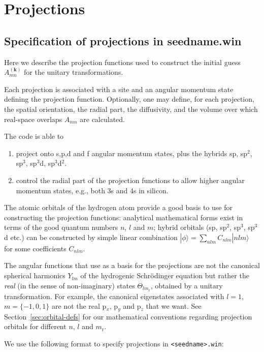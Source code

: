 \chapter{Projections}\label{ch:proj}

\section{Specification of projections in seedname.win}
\label{sec:proj}
Here we describe the projection functions used to construct the
initial guess $A_{mn}^{(\mathbf{k})}$ for the unitary transformations.

Each projection is associated with a site and an angular momentum
state defining the projection function. Optionally, one may define,
for each projection, the spatial orientation, the radial part, the
diffusivity, and the volume over which real-space overlaps $A_{mn}$
are calculated.

The code is able to
\begin{enumerate}
\item project onto s,p,d and f
 angular momentum states, plus the hybrids sp, sp$^2$, sp$^3$, sp$^3$d,
 sp$^3$d$^2$.
\item control the radial part of the projection functions
  to allow higher angular momentum states, e.g., both 3s and 4s in
  silicon.
\end{enumerate}

The atomic orbitals of the hydrogen atom provide a good
basis to use for constructing the projection functions: analytical
mathematical forms exist in terms of the good quantum numbers $n$, $l$
and $m$; hybrid orbitals (sp, sp$^{2}$, sp$^{3}$, sp$^{3}$d etc.) 
can be constructed by simple linear combination $|\phi\rangle =
\sum_{nlm} C_{nlm}|nlm\rangle$ for some coefficients
$C_{nlm}$. 

The angular functions that use as a basis for the
projections are not the canonical spherical harmonics $Y_{lm}$ of the
hydrogenic Schr\"{o}dinger equation but rather the
\textit{real} (in the sense of non-imaginary) states
$\Theta_{lm_{\mathrm{r}}}$, obtained by a unitary
transformation. For example, the canonical
eigenstates associated with $l=1$, $m=\{-1,0,1\}$ are not 
the real p$_{x}$, p$_{y}$ and p$_{z}$
that we want. See Section~\ref{sec:orbital-defs} for our mathematical
conventions regarding projection orbitals for different $n$, $l$ and
$m_{\mathrm{r}}$.
 
We use the following format to specify projections in
\verb#<seedname>.win#:

